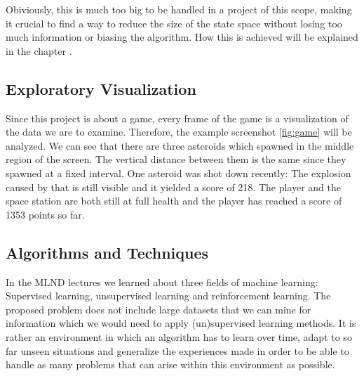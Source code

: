 \documentclass[a4paper,10pt]{article}
\begin{document}
Obiviously, this is much too big to be handled in a project of this scope, making it crucial to find a way to reduce the size of the state space without losing too much information or biasing the algorithm.
How this is achieved will be explained in the chapter .


\subsection{Exploratory Visualization}

Since this project is about a game, every frame of the game is a visualization of the data we are to examine.
Therefore, the example screenshot \ref{fig:game} will be analyzed.
We can see that there are three asteroids which spawned in the middle region of the screen.
The vertical distance between them is the same since they spawned at a fixed interval.
One asteroid was shot down recently: The explosion caused by that is still visible and it yielded a score of 218.
The player and the space station are both still at full health and the player has reached a score of 1353 points so far.
\subsection{Algorithms and Techniques}

In the MLND lectures we learned about three fields of machine learning: Supervised learning, unsupervised learning and reinforcement learning.
The proposed problem does not include large datasets that we can mine for information which we would need to apply (un)supervised learning methods. 
It is rather an environment in which an algorithm has to learn over time, adapt to so far unseen  situations and generalize the experiences made in order to be able to handle as many problems that can arise within this environment as possible.
\end{document}
